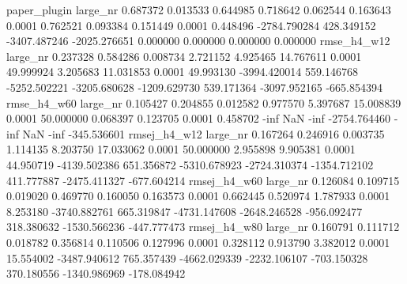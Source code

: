 paper_plugin   large_nr     0.687372    0.013533    0.644985    0.718642    0.062544   0.163643     0.0001   0.762521  0.093384  0.151449   0.0001  0.448496  -2784.790284   428.349152 -3407.487246 -2025.276651          0.000000         0.000000         0.000000         0.000000
 rmse_h4_w12   large_nr     0.237328    0.584286    0.008734    2.721152    4.925465  14.767611     0.0001  49.999924  3.205683 11.031853   0.0001 49.993130  -3994.420014   559.146768 -5252.502221 -3205.680628      -1209.629730       539.171364     -3097.952165      -665.854394
 rmse_h4_w60   large_nr     0.105427    0.204855    0.012582    0.977570    5.397687  15.008839     0.0001  50.000000  0.068397  0.123705   0.0001  0.458702          -inf          NaN         -inf -2754.764460              -inf              NaN             -inf      -345.536601
rmsej_h4_w12   large_nr     0.167264    0.246916    0.003735    1.114135    8.203750  17.033062     0.0001  50.000000  2.955898  9.905381   0.0001 44.950719  -4139.502386   651.356872 -5310.678923 -2724.310374      -1354.712102       411.777887     -2475.411327      -677.604214
rmsej_h4_w60   large_nr     0.126084    0.109715    0.019020    0.469770    0.160050   0.163573     0.0001   0.662445  0.520974  1.787933   0.0001  8.253180  -3740.882761   665.319847 -4731.147608 -2648.246528       -956.092477       318.380632     -1530.566236      -447.777473
rmsej_h4_w80   large_nr     0.160791    0.111712    0.018782    0.356814    0.110506   0.127996     0.0001   0.328112  0.913790  3.382012   0.0001 15.554002  -3487.940612   765.357439 -4662.029339 -2232.106107       -703.150328       370.180556     -1340.986969      -178.084942